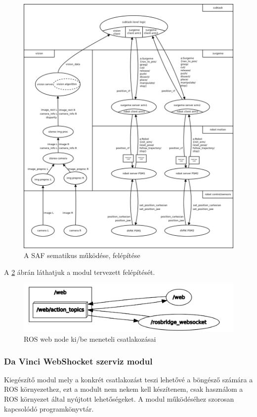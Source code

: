 \documentclass[12pt,a4paper,oneside]{report} %
\begin{document}
\begin{figure}[H]
	
	\begin{center}
		\includegraphics[width=14cm]{irobArch}
		\caption{A SAF sematikus működése, felépítése \cite{Abc-irobotics2020May} }
	\end{center}%
	\label{fig:irob}
\end{figure}
A \ref{fig:irob_web} ábrán láthatjuk a modul tervezett felépítését.
\begin{figure}[H]
	\centering
	\includegraphics[width=14cm]{irob_web}
	\caption{ROS web node ki/be meneteli csatlakozásai}%
	\label{fig:irob_web}
\end{figure}


\subsubsection{Da Vinci WebShocket szerviz modul}
Kiegészítő modul mely a konkrét csatlakozást teszi lehetővé a böngésző számára a ROS környezethez, ezt a modult nem nekem kell készítenem, csak használom a ROS környezet által nyújtott lehetőségeket.
A modul működéséhez szorosan kapcsolódó programkönyvtár.
\end{document}
